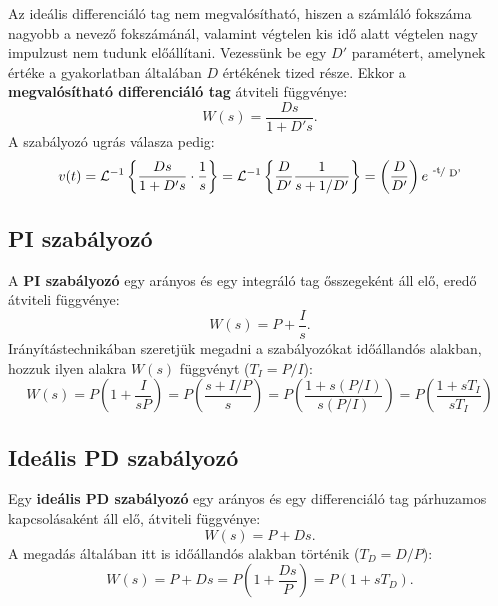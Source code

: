 Az ideális differenciáló tag nem megvalósítható, hiszen a számláló fokszáma
nagyobb a nevező fokszámánál, valamint végtelen kis idő alatt végtelen nagy
impulzust nem tudunk előállítani. Vezessünk be egy $D'$ paramétert, amelynek
értéke a gyakorlatban általában $D$ értékének tized része. Ekkor a
\textbf{megvalósítható differenciáló tag} átviteli függvénye:
\begin{equation}
  W(s) = \frac{Ds}{1 + D's}.
  \label{eq:D-real}
\end{equation}
A szabályozó ugrás válasza pedig:
\begin{equation}
  v(t)
  = \mathcal L^{-1} \left\{
  \frac{Ds}{1 + D's} \cdot \frac{1}{s}
  \right\}
  = \mathcal L^{-1} \left\{
  \frac{D}{D'} \frac{1}{s + 1 / D'}
  \right\}
  = \left( \frac{D}{D'} \right) e^{\slashfrac{-t}{D'}}
  \label{eq:D-real-step}
\end{equation}

\subsection{PI szabályozó}

A \textbf{PI szabályozó} egy arányos és egy integráló tag ősszegeként áll elő,
eredő átviteli függvénye:
\begin{equation}
  W(s) = P + \frac{I}{s}
  .
  \label{eq:PI-base}
\end{equation}
Irányítástechnikában szeretjük megadni a szabályozókat időállandós alakban,
hozzuk ilyen alakra $W(s)$ függvényt ($T_I = P/I$):
\begin{equation}
  W(s)
  = P \left( 1 + \frac{I}{sP}\right)
  = P \left( \frac{s + I/P}{s} \right)
  = P \left( \frac{1 + s (P/I)}{s (P/I)} \right)
  = P \left( \frac{1 + sT_I}{sT_I} \right)
  \label{eq:PI-time}
\end{equation}

\subsection{Ideális PD szabályozó}

Egy \textbf{ideális PD szabályozó} egy arányos és egy differenciáló tag
párhuzamos kapcsolásaként áll elő, átviteli függvénye:
\begin{equation}
  W(s) = P + Ds
  .
  \label{eq:PD-ideal-base}
\end{equation}
A megadás általában itt is időállandós alakban történik ($T_D = D/P$):
\begin{equation}
  W(s)
  = P + Ds
  = P \left( 1 + \frac{Ds}{P} \right)
  = P (1 + sT_D)
  .
  \label{eq:PD-ideal-time}
\end{equation}


